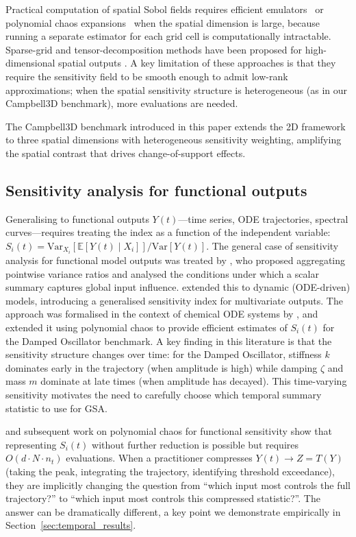 \documentclass[11pt,onecolumn]{article}
\begin{document}
Practical computation of spatial Sobol fields requires efficient
emulators~\citep{Oakley2004} or polynomial chaos
expansions~\citep{Sudret2008} when the spatial dimension is large, because
running a separate estimator for each grid cell is computationally intractable.
Sparse-grid and tensor-decomposition methods have been proposed for high-dimensional
spatial outputs \citep{Buzzard2012,Blatman2011}. A key limitation of these
approaches is that they require the sensitivity field to be smooth enough to
admit low-rank approximations; when the spatial sensitivity structure is
heterogeneous (as in our Campbell3D benchmark), more evaluations are needed.

The Campbell3D benchmark introduced in this paper extends the 2D framework
to three spatial dimensions with heterogeneous sensitivity weighting, amplifying
the spatial contrast that drives change-of-support effects.

\subsection{Sensitivity analysis for functional outputs}
\label{sec:lit_functional}

Generalising to functional outputs $Y(t)$---time series, ODE trajectories,
spectral curves---requires treating the index as a function of the independent
variable: $S_i(t) = \mathrm{Var}_{X_i}[\mathbb{E}[Y(t) \mid X_i]] / \mathrm{Var}[Y(t)]$.
The general case of sensitivity analysis for functional model outputs was treated
by \citet{Campbell2006}, who proposed aggregating pointwise variance ratios and
analysed the conditions under which a scalar summary captures global input
influence. \citet{Lamboni2011} extended this to dynamic (ODE-driven) models,
introducing a generalised sensitivity index for multivariate outputs.
The approach was formalised in the context of chemical ODE
systems by \citet{Saltelli2005}, and \citet{Sudret2008} extended it using polynomial chaos to provide
efficient estimates of $S_i(t)$ for the Damped Oscillator benchmark.
A key finding in this literature is that the sensitivity structure changes over
time: for the Damped Oscillator, stiffness $k$ dominates early in the trajectory
(when amplitude is high) while damping $\zeta$ and mass $m$ dominate at late
times (when amplitude has decayed). This time-varying sensitivity motivates the
need to carefully choose which temporal summary statistic to use for GSA.

\citet{Sudret2008} and subsequent work on polynomial chaos for functional
sensitivity \citep{Blatman2011,Crestaux2009,XiuKarniadakis2002} show that representing $S_i(t)$ without further
reduction is possible but requires $O(d \cdot N \cdot n_t)$ evaluations.
When a practitioner compresses $Y(t) \to Z = T(Y)$ (taking the peak, integrating
the trajectory, identifying threshold exceedance), they are implicitly changing
the question from ``which input most controls the full trajectory?'' to ``which
input most controls this compressed statistic?''. The answer can be dramatically
different, a key point we demonstrate empirically in Section~\ref{sec:temporal_results}.
\end{document}
